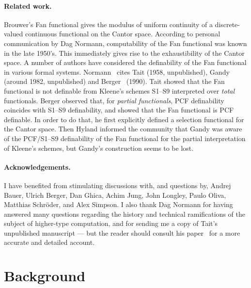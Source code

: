 \documentclass{LMCS}
\newcommand{\myparagraph}{\paragraph}
\begin{document}
\pagebreak[4]
\myparagraph{Related work.}  Brouwer's Fan functional gives the
modulus of uniform continuity of a discrete-valued continuous
functional on the Cantor space.  According to personal communication
by Dag Normann, computability of the Fan functional was known in the
late 1950's. This immediately gives rise to the exhaustibility of the
Cantor space. A number of authors have considered the definability of
the Fan functional in various formal systems.
Normann~\cite{normann:computer} cites Tait (1958, unpublished), Gandy
(around 1982, unpublished) and Berger~\cite{berger:thesis} (1990).
Tait showed that the Fan functional is not definable from Kleene's
schemes S1--S9 interpreted over \emph{total} functionals. Berger
observed that, for \emph{partial functionals}, PCF definability
coincides with S1--S9 definability, and showed that the Fan functional
is PCF definable. In order to do that, he first explicitly defined a
selection functional for the Cantor space.  Then Hyland informed the
community that Gandy was aware of the PCF/S1--S9 definability of the
Fan functional for the partial interpretation of Kleene's schemes,
but Gandy's construction seems to be lost.



\pagebreak[3] \myparagraph{Acknowledgements.} I have benefited from
stimulating discussions with, and questions by, Andrej Bauer, Ulrich
Berger, Dan Ghica, Achim Jung, John Longley, Paulo Oliva, Matthias
Schr\"oder, and Alex Simpson. I also thank Dag Normann for having
answered many questions regarding the history and technical
ramifications of the subject of higher-type computation, and for
sending me a copy of Tait's unpublished manuscript --- but the reader
should consult his paper~\cite{normann:computer} for a more accurate
and detailed account.

\section{Background} \label{background}
\end{document}
